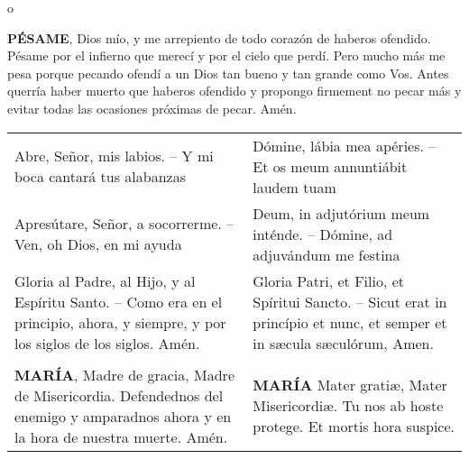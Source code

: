\documentclass[./rosary.tex]{subfiles}
\begin{document}
\begin{center}
    o
\end{center}

\label{condolences}
\textbf{PÉSAME}, Dios mío, y me arrepiento de todo corazón de haberos ofendido. Pésame por el infierno que merecí y por el cielo que perdí. Pero mucho
más me pesa porque pecando ofendí a un Dios tan bueno y tan grande como Vos. Antes querría haber muerto que haberos ofendido y propongo firmement no pecar
más y evitar todas las ocasiones próximas de pecar. Amén.

\begin{longtable} {p{} p{} }
    Abre, Señor, mis labios. -- Y mi boca cantará tus alabanzas                                                           
    
     & 
    
    Dómine, lábia mea apéries. -- Et os meum annuntiábit laudem tuam\\
    Apresútare, Señor, a socorrerme. -- Ven, oh Dios, en mi ayuda                                                    
    
     & 
    
    Deum, in adjutórium meum inténde. -- Dómine, ad adjuvándum me festina\\
    \label{sec:glory}Gloria al Padre, al Hijo, y al Espíritu Santo. -- Como era en el principio, ahora, y siempre, y por los siglos de los siglos. Amén.                   
    
     & 
    
    Gloria Patri, et Filio, et Spíritui Sancto. -- Sicut erat in princípio et nunc, et semper et in sæcula sæculórum, Amen. \\\\
    \textbf{MARÍA}, Madre de gracia, Madre de Misericordia. Defendednos del enemigo y amparadnos ahora y en la hora de nuestra muerte. Amén.                               
    
     & 
    
    \textbf{MARÍA} Mater gratiæ, Mater Misericordiæ. Tu nos ab hoste protege. Et mortis hora suspice.

\end{longtable}
\end{document}

